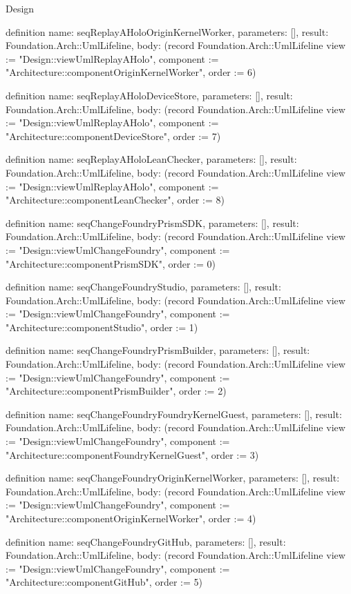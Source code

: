\begin{lexlean}{Design}
\begin{semanticmodule}
definition{
  name: seqReplayAHoloOriginKernelWorker,
  parameters: [],
  result: Foundation.Arch::UmlLifeline,
  body: (record Foundation.Arch::UmlLifeline {view := "Design::viewUmlReplayAHolo", component := "Architecture::componentOriginKernelWorker", order := 6})
}

definition{
  name: seqReplayAHoloDeviceStore,
  parameters: [],
  result: Foundation.Arch::UmlLifeline,
  body: (record Foundation.Arch::UmlLifeline {view := "Design::viewUmlReplayAHolo", component := "Architecture::componentDeviceStore", order := 7})
}

definition{
  name: seqReplayAHoloLeanChecker,
  parameters: [],
  result: Foundation.Arch::UmlLifeline,
  body: (record Foundation.Arch::UmlLifeline {view := "Design::viewUmlReplayAHolo", component := "Architecture::componentLeanChecker", order := 8})
}

definition{
  name: seqChangeFoundryPrismSDK,
  parameters: [],
  result: Foundation.Arch::UmlLifeline,
  body: (record Foundation.Arch::UmlLifeline {view := "Design::viewUmlChangeFoundry", component := "Architecture::componentPrismSDK", order := 0})
}

definition{
  name: seqChangeFoundryStudio,
  parameters: [],
  result: Foundation.Arch::UmlLifeline,
  body: (record Foundation.Arch::UmlLifeline {view := "Design::viewUmlChangeFoundry", component := "Architecture::componentStudio", order := 1})
}

definition{
  name: seqChangeFoundryPrismBuilder,
  parameters: [],
  result: Foundation.Arch::UmlLifeline,
  body: (record Foundation.Arch::UmlLifeline {view := "Design::viewUmlChangeFoundry", component := "Architecture::componentPrismBuilder", order := 2})
}

definition{
  name: seqChangeFoundryFoundryKernelGuest,
  parameters: [],
  result: Foundation.Arch::UmlLifeline,
  body: (record Foundation.Arch::UmlLifeline {view := "Design::viewUmlChangeFoundry", component := "Architecture::componentFoundryKernelGuest", order := 3})
}

definition{
  name: seqChangeFoundryOriginKernelWorker,
  parameters: [],
  result: Foundation.Arch::UmlLifeline,
  body: (record Foundation.Arch::UmlLifeline {view := "Design::viewUmlChangeFoundry", component := "Architecture::componentOriginKernelWorker", order := 4})
}

definition{
  name: seqChangeFoundryGitHub,
  parameters: [],
  result: Foundation.Arch::UmlLifeline,
  body: (record Foundation.Arch::UmlLifeline {view := "Design::viewUmlChangeFoundry", component := "Architecture::componentGitHub", order := 5})
}


\end{semanticmodule}
\end{lexlean}
